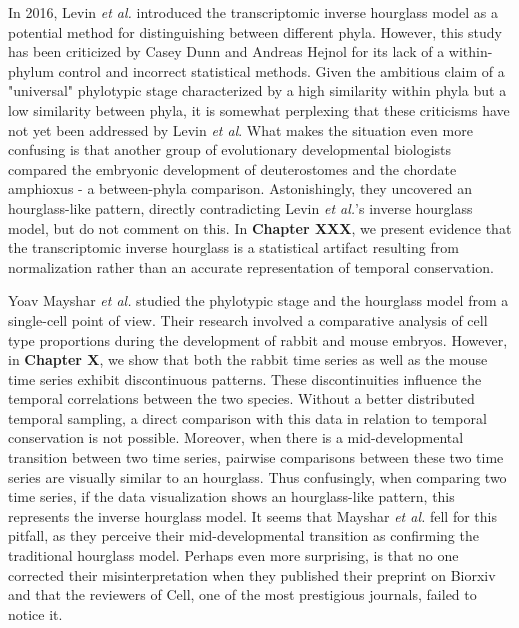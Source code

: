 In 2016, Levin \textit{et al.} introduced the transcriptomic inverse hourglass model as a potential method for distinguishing between different phyla\cite{Levin2016}. However, this study has been criticized by Casey Dunn and Andreas Hejnol for its lack of a within-phylum control\cite{hejnol2016} and incorrect statistical methods\cite{Dunn2018}. Given the ambitious claim of a "universal" phylotypic stage characterized by a high similarity within phyla but a low similarity between phyla, it is somewhat perplexing that these criticisms have not yet been addressed by Levin \textit{et al}. What makes the situation even more confusing is that another group of evolutionary developmental biologists compared the embryonic development of deuterostomes and the chordate amphioxus - a between-phyla comparison. Astonishingly, they uncovered an hourglass-like pattern\cite{PerezPosada2022}, directly contradicting Levin \textit{et al.}'s inverse hourglass model, but do not comment on this. In \textbf{Chapter XXX}, we present evidence that the transcriptomic inverse hourglass is a statistical artifact resulting from normalization rather than an accurate representation of temporal conservation. 

Yoav Mayshar \textit{et al.} studied the phylotypic stage and the hourglass model from a single-cell point of view\cite{Mayshar2023}. Their research involved a comparative analysis of cell type proportions during the development of rabbit and mouse embryos. However, in \textbf{Chapter X}, we show that both the rabbit time series as well as the mouse time series exhibit discontinuous patterns. These discontinuities influence the temporal correlations between the two species. Without a better distributed temporal sampling, a direct comparison with this data in relation to temporal conservation is not possible. Moreover, when there is a mid-developmental transition between two time series, pairwise comparisons between these two time series are visually similar to an hourglass. Thus confusingly, when comparing two time series, if the data visualization shows an hourglass-like pattern, this represents the inverse hourglass model. It seems that Mayshar \textit{et al.} fell for this pitfall, as they perceive their mid-developmental transition as confirming the traditional hourglass model. Perhaps even more surprising, is that no one corrected their misinterpretation when they published their preprint on Biorxiv and that the reviewers of Cell, one of the most prestigious journals, failed to notice it.

